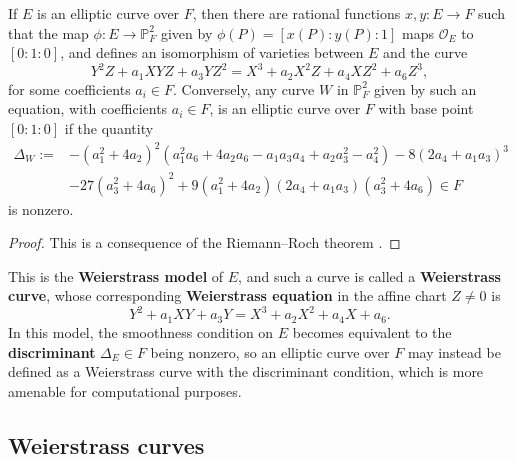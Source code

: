 \documentclass[a4paper,UKenglish,cleveref,autoref,thm-restate]{lipics-v2021}
\begin{document}
\begin{proposition}
\label{prop:weierstrass}
If $ E $ is an elliptic curve over $ F $, then there are rational functions $ x, y : E \to F $ such that the map $ \phi : E \to \mathbb{P}_F^2 $ given by $ \phi(P) = [x(P) : y(P) : 1] $ maps $ \mathcal{O}_E $ to $ [0 : 1 : 0] $, and defines an isomorphism of varieties between $ E $ and the curve
\[ Y^2Z + a_1XYZ + a_3YZ^2 = X^3 + a_2X^2Z + a_4XZ^2 + a_6Z^3, \]
for some coefficients $ a_i \in F $. Conversely, any curve $ W $ in $ \mathbb{P}_F^2 $ given by such an equation, with coefficients $ a_i \in F $, is an elliptic curve over $ F $ with base point $ [0 : 1 : 0] $ if the quantity
\begin{align*}
\Delta_W := & -(a_1^2 + 4a_2)^2(a_1^2a_6 + 4a_2a_6 - a_1a_3a_4 + a_2a_3^2 - a_4^2) - 8(2a_4 + a_1a_3)^3 \\
& - 27(a_3^2 + 4a_6)^2 + 9(a_1^2 + 4a_2)(2a_4 + a_1a_3)(a_3^2 + 4a_6) \in F
\end{align*}
is nonzero.
\end{proposition}

\begin{proof}
This is a consequence of the Riemann--Roch theorem \cite[Proposition III.3.1]{silverman}.
\end{proof}

This is the \textbf{Weierstrass model} of $ E $, and such a curve is called a \textbf{Weierstrass curve}, whose corresponding \textbf{Weierstrass equation} in the affine chart $ Z \ne 0 $ is
\[ Y^2 + a_1XY + a_3Y = X^3 + a_2X^2 + a_4X + a_6. \]
In this model, the smoothness condition on $ E $ becomes equivalent to the \textbf{discriminant} $ \Delta_E \in F $ being nonzero, so an elliptic curve over $ F $ may instead be defined as a Weierstrass curve with the discriminant condition, which is more amenable for computational purposes.

\subsection{Weierstrass curves}
\end{document}
